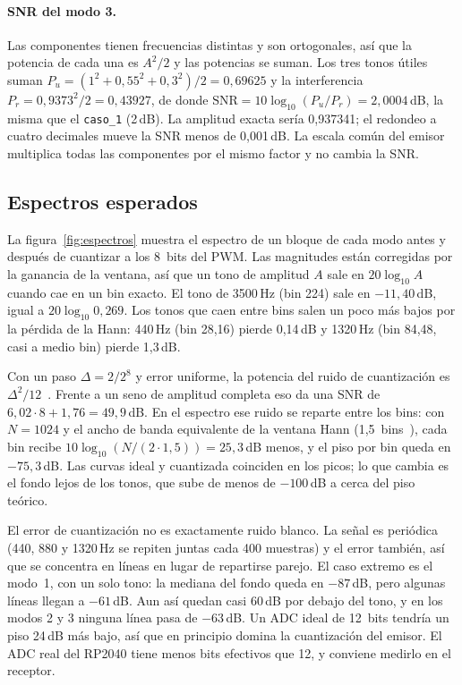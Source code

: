 \paragraph{SNR del modo 3.} Las componentes tienen frecuencias distintas y son
ortogonales, así que la potencia de cada una es $A^2/2$ y las potencias se
suman. Los tres tonos útiles suman
$P_u = (1^2 + 0{,}55^2 + 0{,}3^2)/2 = 0{,}69625$ y la interferencia
$P_r = 0{,}9373^2/2 = 0{,}43927$, de donde
$\text{SNR} = 10\log_{10}(P_u/P_r) = 2{,}0004$\,dB, la misma que el
\texttt{caso\_1} (2\,dB). La amplitud exacta sería 0,937341; el redondeo a cuatro
decimales mueve la SNR menos de 0,001\,dB. La escala común del emisor multiplica
todas las componentes por el mismo factor y no cambia la SNR.

\subsection{Espectros esperados}

La figura~\ref{fig:espectros} muestra el espectro de un bloque de cada modo
antes y después de cuantizar a los 8~bits del PWM. Las magnitudes están
corregidas por la ganancia de la ventana, así que un tono de amplitud $A$ sale
en $20\log_{10}A$ cuando cae en un bin exacto. El tono de 3500\,Hz (bin 224)
sale en $-11{,}40$\,dB, igual a $20\log_{10}0{,}269$. Los tonos que caen entre
bins salen un poco más bajos por la pérdida de la Hann: 440\,Hz (bin 28,16)
pierde 0,14\,dB y 1320\,Hz (bin 84,48, casi a medio bin) pierde 1,3\,dB.

Con un paso $\Delta = 2/2^8$ y error uniforme, la potencia del ruido de
cuantización es $\Delta^2/12$~\cite{oppenheim2010}. Frente a un seno de amplitud completa eso da una
SNR de $6{,}02\cdot 8 + 1{,}76 = 49{,}9$\,dB. En el espectro ese ruido se
reparte entre los bins: con $N = 1024$ y el ancho de banda equivalente de la
ventana Hann (1,5~bins~\cite{harris1978}), cada bin recibe $10\log_{10}(N/(2\cdot 1{,}5)) =
25{,}3$\,dB menos, y el piso por bin queda en $-75{,}3$\,dB. Las curvas ideal y
cuantizada coinciden en los picos; lo que cambia es el fondo lejos de los tonos,
que sube de menos de $-100$\,dB a cerca del piso teórico.

El error de cuantización no es exactamente ruido blanco. La señal es periódica
(440, 880 y 1320\,Hz se repiten juntas cada 400 muestras) y el error también,
así que se concentra en líneas en lugar de repartirse parejo. El caso extremo es
el modo~1, con un solo tono: la mediana del fondo queda en $-87$\,dB, pero
algunas líneas llegan a $-61$\,dB. Aun así quedan casi 60\,dB por debajo del
tono, y en los modos 2 y 3 ninguna línea pasa de $-63$\,dB. Un ADC ideal de
12~bits tendría un piso 24\,dB más bajo, así que en principio domina la
cuantización del emisor. El ADC real del RP2040 tiene menos bits efectivos que
12, y conviene medirlo en el receptor.

